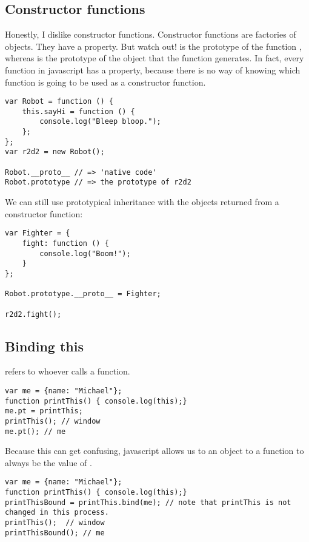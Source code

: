 \subsection{Constructor functions}

Honestly, I dislike constructor functions. 
Constructor functions are factories of objects. They have a   property. But watch out! 
 is the prototype of the function , whereas   is the prototype of the object that the function generates.
In fact, every function in javascript has a   property, because there is no way of knowing which function is going to be used as a constructor function. 

\begin{lstlisting}
var Robot = function () {
    this.sayHi = function () {
        console.log("Bleep bloop.");
    };
};
var r2d2 = new Robot();

Robot.__proto__ // => 'native code'
Robot.prototype // => the prototype of r2d2
\end{lstlisting}

We can still use prototypical inheritance with the objects returned from a constructor function:

\begin{lstlisting}
var Fighter = {
	fight: function () {
		console.log("Boom!");
	}
};

Robot.prototype.__proto__ = Fighter;

r2d2.fight();
\end{lstlisting}





\subsection{Binding this}
 refers to whoever calls a function.
\begin{lstlisting}
var me = {name: "Michael"};
function printThis() { console.log(this);}
me.pt = printThis;
printThis(); // window
me.pt(); // me
\end{lstlisting}
Because this can get confusing, javascript allows us to  an object to a function to always be the value of .
\begin{lstlisting}
var me = {name: "Michael"};
function printThis() { console.log(this);}
printThisBound = printThis.bind(me); // note that printThis is not changed in this process. 
printThis();  // window
printThisBound(); // me
\end{lstlisting}


